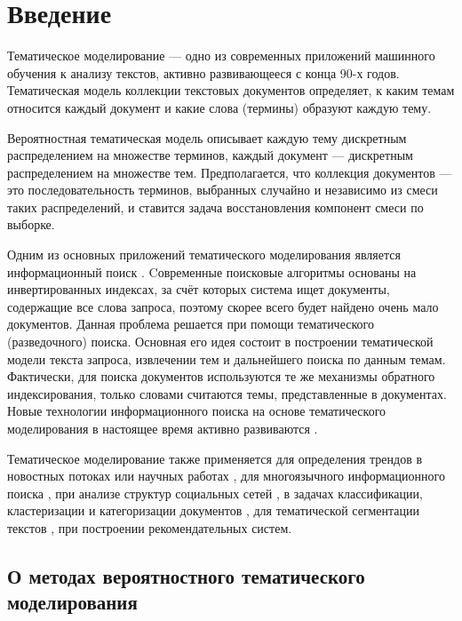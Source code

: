 \documentclass[12pt]{article}
\renewcommand{\baselinestretch}{1.4}
\begin{document}
\tableofcontents
\newpage
\renewcommand{\baselinestretch}{1.5}
\section{Введение}

Тематическое моделирование --- одно из современных приложений машинного обучения к анализу текстов, активно развивающееся с конца 90-х годов. Тематическая модель коллекции текстовых документов определяет, к каким темам относится каждый документ и какие слова (термины) образуют каждую тему.

Вероятностная тематическая модель описывает каждую тему дискретным распределением на множестве терминов, каждый документ --- дискретным распределением на множестве тем. Предполагается, что коллекция документов --- это последовательность терминов, выбранных случайно и независимо из смеси таких распределений, и ставится задача восстановления компонент смеси по выборке.

Одним из основных приложений тематического моделирования является информационный поиск \cite{inforetr}. Cовременные поисковые алгоритмы основаны на инвертированных индексах, за счёт которых система ищет документы, содержащие все слова запроса, поэтому скорее всего будет найдено очень мало документов. Данная проблема решается при помощи тематического (разведочного) поиска. Основная его идея состоит в построении тематической модели текста запроса, извлечении тем и дальнейшего поиска по данным темам. Фактически, для поиска документов используются те же механизмы обратного индексирования, только словами считаются темы, представленные в документах. Новые технологии информационного поиска на основе тематического моделирования в настоящее время активно развиваются \cite{inforetrtm1, inforetrtm2}.

Тематическое моделирование также применяется для определения трендов в новостных потоках или научных работах  \cite{textflow1, textflow2}, для многоязычного информационного поиска  \cite{multilang1, multilang2}, при анализе структур социальных сетей \cite{socnet1, socnet2},  в задачах классификации, кластеризации и категоризации документов \cite{tmtask1, tmtask2}, для тематической сегментации текстов \cite{segtask}, при построении рекомендательных систем\cite{recsys1, recsys2}.

\subsection{О методах вероятностного тематического моделирования}
\end{document}
